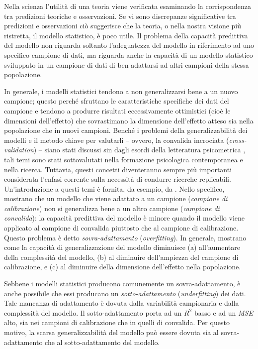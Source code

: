 \documentclass[
  11pt,
]{krantz}
\theoremstyle{definition}
\theoremstyle{definition}
\theoremstyle{definition}
\theoremstyle{definition}
\theoremstyle{remark}
\begin{document}
Nella scienza l'utilità di una teoria viene verificata esaminando la corrispondenza tra predizioni teoriche e osservazioni. Se vi sono discrepanze significative tra predizioni e osservazioni ciò suggerisce che la teoria, o nella nostra visione più ristretta, il modello statistico, è poco utile. Il problema della capacità predittiva del modello non riguarda soltanto l'adeguatezza del modello in riferimento ad uno specifico campione di dati, ma riguarda anche la capacità di un modello statistico sviluppato in un campione di dati di ben adattarsi ad altri campioni della stessa popolazione.

In generale, i modelli statistici tendono a non generalizzarsi bene a un nuovo campione; questo perché sfruttano le caratteristiche specifiche dei dati del campione e tendono a produrre risultati eccessivamente ottimistici (cioè le dimensioni dell'effetto) che sovrastimano la dimensione dell'effetto atteso sia nella popolazione che in nuovi campioni. Benché i problemi della generalizzabilità dei modelli e il metodo chiave per valutarli -- ovvero, la convalida incrociata (\emph{cross-validation}) -- siano stati discussi sin dagli esordi della letteratura psicometrica \citep{lord1950efficiency}, tali temi sono stati sottovalutati nella formazione psicologica contemporanea e nella ricerca. Tuttavia, questi concetti diventeranno sempre più importanti considerata l'enfasi corrente sulla necessità di condurre ricerche replicabili. Un'introduzione a questi temi è fornita, da esempio, da \citet{song2021making}. Nello specifico, \citet{song2021making} mostrano che un modello che viene adattato a un campione (\emph{campione di calibrazione}) non si generalizza bene a un altro campione (\emph{campione di convalida}): la capacità predittiva del modello è minore quando il modello viene applicato al campione di convalida piuttosto che al campione di calibrazione. Questo problema è detto \emph{sovra-adattamento} (\emph{overfitting}). In generale, \citet{song2021making} mostrano come la capacità di generalizzazione del modello diminuisce (a) all'aumentare della complessità del modello, (b) al diminuire dell'ampiezza del campione di calibrazione, e (c) al diminuire della dimensione dell'effetto nella popolazione.

Sebbene i modelli statistici producono comunemente un sovra-adattamento, è anche possibile che essi producano un \emph{sotto-adattamento} (\emph{underfitting}) dei dati. Tale mancanza di adattamento è dovuta dalla variabilità campionaria e dalla complessità del modello. Il sotto-adattamento porta ad un \(R^2\) basso e ad un \emph{MSE} alto, sia nei campioni di calibrazione che in quelli di convalida. Per questo motivo, la scarsa generalizzabilità del modello può essere dovuta sia al sovra-adattamento che al sotto-adattamento del modello.
\end{document}
